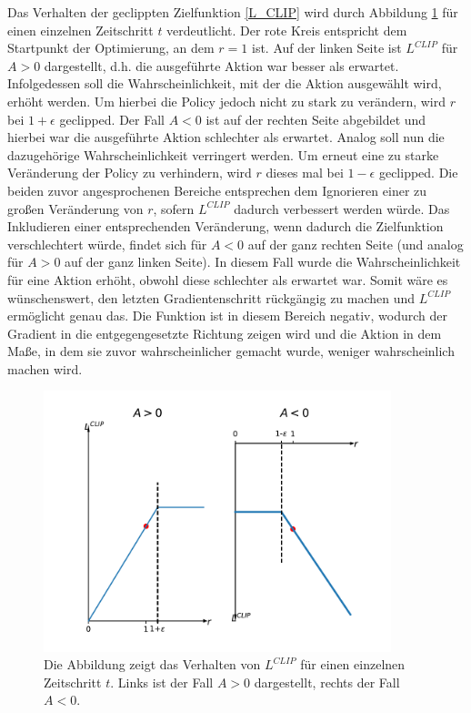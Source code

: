 Das Verhalten der geclippten Zielfunktion \eqref{L_CLIP} wird durch Abbildung \ref{fig_L_clip} für einen einzelnen Zeitschritt $t$ verdeutlicht. Der rote Kreis entspricht dem Startpunkt der Optimierung, an dem $r = 1$ ist. Auf der linken Seite ist $L^{CLIP}$ für $A > 0$ dargestellt, d.h. die ausgeführte Aktion war besser als erwartet. Infolgedessen soll die Wahrscheinlichkeit, mit der die Aktion ausgewählt wird, erhöht werden. Um hierbei die Policy jedoch nicht zu stark zu verändern, wird $r$ bei $1+\epsilon$ geclipped. Der Fall $A < 0$ ist auf der rechten Seite abgebildet und hierbei war die ausgeführte Aktion schlechter als erwartet. Analog soll nun die dazugehörige Wahrscheinlichkeit verringert werden. Um erneut eine zu starke Veränderung der Policy zu verhindern, wird $r$ dieses mal bei $1-\epsilon$ geclipped. Die beiden zuvor angesprochenen Bereiche entsprechen dem Ignorieren einer zu großen Veränderung von $r$, sofern $L^{CLIP}$ dadurch verbessert werden würde. Das Inkludieren einer entsprechenden Veränderung, wenn dadurch die Zielfunktion verschlechtert würde, findet sich für $A < 0$ auf der ganz rechten Seite (und analog für $A > 0$ auf der ganz linken Seite). In diesem Fall wurde die Wahrscheinlichkeit für eine Aktion erhöht, obwohl diese schlechter als erwartet war. Somit wäre es wünschenswert, den letzten Gradientenschritt rückgängig zu machen und $L^{CLIP}$ ermöglicht genau das. Die Funktion ist in diesem Bereich negativ, wodurch der Gradient in die entgegengesetzte Richtung zeigen wird und die Aktion in dem Maße, in dem sie zuvor wahrscheinlicher gemacht wurde, weniger wahrscheinlich machen wird.

\begin{figure}[ht!]
  \centering
  \includegraphics[height=0.5\textwidth, width=0.9\textwidth]{abbildungen/L_clip.pdf}
  \caption{Die Abbildung zeigt das Verhalten von $L^{CLIP}$ für einen einzelnen Zeitschritt $t$. Links ist der Fall $A > 0$ dargestellt, rechts der Fall $A < 0$.}
  \label{fig_L_clip}
\end{figure}

